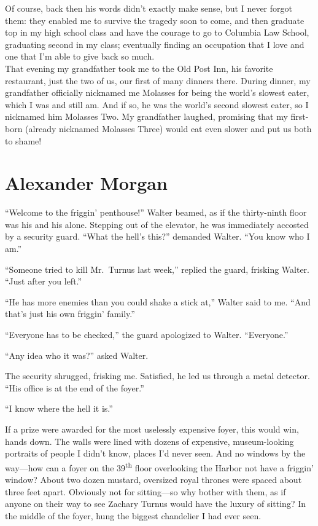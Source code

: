 Of course, back then his words didn't exactly make sense, but I never
forgot them: they enabled me to survive the tragedy soon to come, and
then graduate top in my high school class and have the courage to go to
Columbia Law School, graduating second in my class; eventually finding
an occupation that I love and one that I'm able to give back so much.\\

That evening my grandfather took me to the Old Post Inn, his favorite
restaurant, just the two of us, our first of many dinners there. During
dinner, my grandfather officially nicknamed me Molasses for being the
world's slowest eater, which I was and still am. And if so, he was the
world's second slowest eater, so I nicknamed him Molasses Two. My
grandfather laughed, promising that my first-born (already nicknamed
Molasses Three) would eat even slower and put us both to shame!

\chapter{Alexander Morgan}

\titlemark

``Welcome to the friggin' penthouse!'' Walter beamed, as if the
thirty-ninth floor was his and his alone. Stepping out of the elevator,
he was immediately accosted by a security guard. ``What the hell's
this?'' demanded Walter. ``You know who I am.''

``Someone tried to kill Mr.~Turnus last week,'' replied the guard,
frisking Walter. ``Just after you left.''

``He has more enemies than you could shake a stick at,'' Walter said to
me. ``And that's just his own friggin' family.''

``Everyone has to be checked,'' the guard apologized to Walter.
``Everyone.''

``Any idea who it was?'' asked Walter.

The security shrugged, frisking me. Satisfied, he led us through a metal
detector. ``His office is at the end of the foyer.''

``I know where the hell it is.''

If a prize were awarded for the most uselessly expensive foyer, this
would win, hands down. The walls were lined with dozens of expensive,
museum-looking portraits of people I didn't know, places I'd never seen.
And no windows by the way---how can a foyer on the
39\textsuperscript{th} floor overlooking the Harbor not have a friggin'
window? About two dozen mustard, oversized royal thrones were spaced
about three feet apart. Obviously not for sitting---so why bother with
them, as if anyone on their way to see Zachary Turnus would have the
luxury of sitting? In the middle of the foyer, hung the biggest
chandelier I had ever seen.

